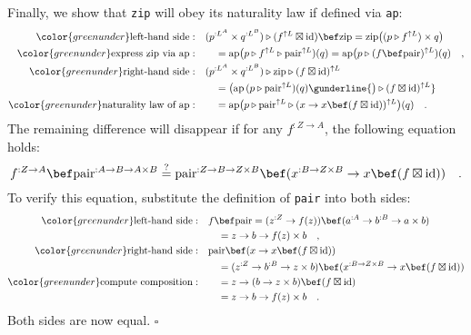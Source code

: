 Finally, we show that \lstinline!zip! will obey its naturality law
if defined via \lstinline!ap!:
\begin{align*}
{\color{greenunder}\text{left-hand side}:}\quad & (p^{:L^{A}}\times q^{:L^{B}})\triangleright(f^{\uparrow L}\boxtimes\text{id})\bef\text{zip}=\text{zip}\big((p\triangleright f^{\uparrow L})\times q\big)\\
{\color{greenunder}\text{express }\text{zip}\text{ via }\text{ap}:}\quad & \quad=\text{ap}\big(p\triangleright f^{\uparrow L}\triangleright\text{pair}^{\uparrow L})(q)=\text{ap}\big(p\triangleright(f\bef\text{pair})^{\uparrow L})(q)\quad,\\
{\color{greenunder}\text{right-hand side}:}\quad & (p^{:L^{A}}\times q^{:L^{B}})\triangleright\text{zip}\triangleright(f\boxtimes\text{id})^{\uparrow L}\\
 & \quad=\big(\text{ap}\,(p\triangleright\text{pair}^{\uparrow L})(q)\gunderline{\big)\triangleright(f\boxtimes\text{id})^{\uparrow L}}\\
{\color{greenunder}\text{naturality law of }\text{ap}:}\quad & \quad=\text{ap}\big(p\triangleright\text{pair}^{\uparrow L}\triangleright(x\rightarrow x\bef(f\boxtimes\text{id}))^{\uparrow L}\big)(q)\quad.
\end{align*}
The remaining difference will disappear if for any $f^{:Z\rightarrow A}$,
the following equation holds:
\[
f^{:Z\rightarrow A}\bef\text{pair}^{:A\rightarrow B\rightarrow A\times B}\overset{?}{=}\text{pair}^{:Z\rightarrow B\rightarrow Z\times B}\bef(x^{:B\rightarrow Z\times B}\rightarrow x\bef(f\boxtimes\text{id}))\quad.
\]
To verify this equation, substitute the definition of \lstinline!pair!
into both sides:
\begin{align*}
{\color{greenunder}\text{left-hand side}:}\quad & f\bef\text{pair}=(z^{:Z}\rightarrow f(z))\bef(a^{:A}\rightarrow b^{:B}\rightarrow a\times b)\\
 & \quad=z\rightarrow b\rightarrow f(z)\times b\quad,\\
{\color{greenunder}\text{right-hand side}:}\quad & \text{pair}\bef(x\rightarrow x\bef(f\boxtimes\text{id}))\\
 & \quad=(z^{:Z}\rightarrow b^{:B}\rightarrow z\times b)\bef(x^{:B\rightarrow Z\times B}\rightarrow x\bef(f\boxtimes\text{id}))\\
{\color{greenunder}\text{compute composition}:}\quad & \quad=z\rightarrow(b\rightarrow z\times b)\bef(f\boxtimes\text{id})\\
 & \quad=z\rightarrow b\rightarrow f(z)\times b\quad.
\end{align*}
Both sides are now equal. $\square$

